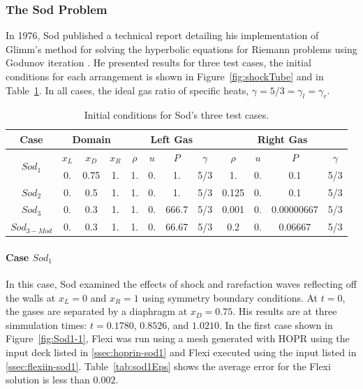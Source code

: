 \subsubsection{The Sod Problem}\label{ss:Sod}

In 1976, Sod\cite{sod1} published a technical report detailing his implementation of Glimm's method\cite{glimm} for solving the hyperbolic equations for Riemann problems using Godunov iteration \cite{godunov}.  He presented results for three test cases, the initial conditions for each arrangement is shown in Figure~\ref{fig:shockTube}  and in Table~\ref{tab:sodIC}.  In all cases, the ideal gas ratio of specific heats, $\gamma = 5/3 = \gamma_l = \gamma_r$.

\begin{table}[h!]
 \begin{center}
  \caption{Initial conditions for Sod's three test cases.}
  \label{tab:sodIC}
  \begin{tabular}{|c|ccc|cccc|cccc|} \hline
   \textbf{Case} & \multicolumn{3}{c|}{\textbf{Domain}} & \multicolumn{4}{c|}{\textbf{Left Gas}} & \multicolumn{4}{c|}{\textbf{Right Gas}} \\ \hline
   \multirow{2}{*}{$Sod_1$} & $x_L$ & $x_D$ & $x_R$ & $\rho$ & $u$ & $P$ & $\gamma$ & $\rho$ & $u$ & $P$ & $\gamma$ \\ \cline{2-12}
   \multicolumn{1}{|c|}{} & 0. & 0.75 & 1.  & 1. & 0. & 1. & 5/3 & 1. & 0. & 0.1 & 5/3 \\ \hline
   $Sod_2$  & 0. & 0.5 & 1.  & 1. & 0. & 1. & 5/3 & 0.125 & 0. & 0.1 & 5/3 \\ \hline
   $Sod_3$ & 0. & 0.3 & 1.  & 1. & 0. & 666.7 & 5/3 & 0.001 & 0. & 0.00000667 & 5/3 \\ \hline
   $Sod_{3-Mod}$ & 0. & 0.3 & 1.  & 1. & 0. & 66.67 & 5/3 & 0.2 & 0. & 0.06667 & 5/3 \\ \hline
  \end{tabular}
 \end{center}
\end{table}

\paragraph{Case $Sod_1$}

In this case, Sod examined the effects of shock and rarefaction waves reflecting off the walls at $x_L = 0$ and $x_R = 1$ using symmetry boundary conditions.  At  $t = 0$, the gases are separated by a diaphragm at $x_D = 0.75$. His results are at three simmulation times: $t = 0.1780$, $0.8526$, and $1.0210$. In the first case shown in Figure~\ref{fig:Sod1-1}, Flexi was run using a mesh generated with HOPR using the input deck listed in \ref{ssec:hoprin-sod1} and Flexi executed using the input listed in \ref{ssec:flexiin-sod1}. Table~\ref{tab:sod1Eps} shows the average error for the Flexi solution is less than $0.002$.

